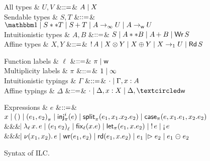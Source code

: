 \begin{figure*}[t]
  \centering
  \begin{minipage}{.58\textwidth}
    \centering
    \begin{grammar}
        All types
      & $U, V$
        &$\bnfas$& $A \bnfalt X$
      \\
      Sendable types
      & $S, T$
      &$\bnfas$& $\tyUnit \bnfalt S ** T \bnfalt \tySum{S}{}{T} \bnfalt
      \tyArr{A}{\infty}{U} \bnfalt \tyArr{A}{\wm}{U}$
      \\
      Intuitionistic types
      & $A,B$
      &$\bnfas$& $S \bnfalt A ** B \bnfalt \tySum{A}{}{B} \bnfalt \tyWr{S}$
      \\
      Affine types
      & $X,Y$
      &$\bnfas$& $\tyBang{A} \bnfalt
      \tyTensor{X}{Y} \bnfalt \tyOplus{X}{Y} \bnfalt \tyArr{X}{1}{U} \bnfalt \tyRd{S}$
    \end{grammar}      
  \end{minipage}%
  \begin{minipage}{.42\textwidth}
    \centering
    \begin{grammar}
      Function labels
      & $\ell$
      &$\bnfas$& $\pi \bnfalt \wm$      
      \\      
      Multiplicity labels
      & $\pi$
      &$\bnfas$& $1 \bnfalt \infty$      
      \\
      Intuitionistic typings
      & $\Gamma$
      &$\bnfas$& $\emptyctxt \bnfalt \Gamma,x:A$
      \\
      Affine typings
      & $\Delta$
      &$\bnfas$& $\emptyctxt \bnfalt \Delta,x:X \bnfalt \Delta, \wrtok$
    \end{grammar}    
  \end{minipage}
  \begin{grammar}
    Expressions
    & $e$
    &$\bnfas$&
    $\eVar{x} \bnfalt \eUnit \bnfalt \ePair{e_1}{e_2}{\pi} \bnfalt \eInj{i}{e}
    \bnfalt \eSplit{e_1}{x_1}{x_2}{e_2} \bnfalt
    \eCase{\pi}{e}{x_1}{e_1}{x_2}{e_2}$
    \\ &&& $\bnfaltbrk \eLamm{\ell}{x}{e} \bnfalt \eApp{e_1}{e_2}{\ell} \bnfalt \eFixx{\ell}{x}{e}
    \bnfalt \eLet{x}{e_1}{e_2} \bnfalt \eBang{e} \bnfalt \eUnbang{e}$
    \\ &&& $\bnfaltbrk \eNu{(x_1,x_2)}{e} \bnfalt \eWr{e_1}{e_2} \bnfalt
    \eLetRd{e_1}{x}{e_2} \bnfalt \eFork{e_1}{e_2} \bnfalt \eChoice{e_1}{e_2}$
  \end{grammar}      
  \caption{Syntax of ILC.}
  \label{fig:ilc-syntax}
\end{figure*}
